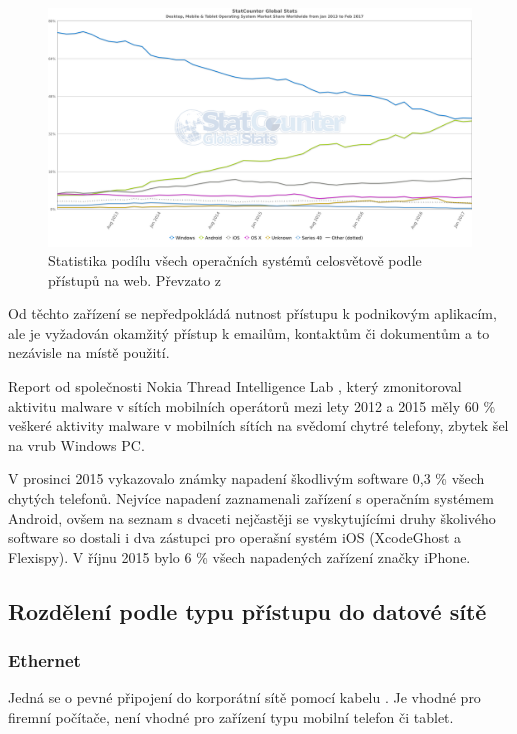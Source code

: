 \begin{figure}[h]
\includegraphics[width=13cm]{img/StatCounter_All_Worldwide}
\caption{Statistika podílu všech operačních systémů celosvětově podle přístupů na web. Převzato z \cite{Statcounter2}} 
\centering
\end{figure}%
 
Od těchto zařízení se nepředpokládá nutnost přístupu k podnikovým aplikacím, ale je vyžadován okamžitý přístup k emailům, kontaktům či dokumentům a to nezávisle na místě použití.

Report od společnosti Nokia Thread Intelligence Lab %
\cite{Nokia2, Nokia1}, který zmonitoroval aktivitu malware v sítích mobilních operátorů mezi lety 2012 a 2015 měly 60 \% veškeré aktivity malware v mobilních sítích na svědomí chytré telefony, zbytek šel na vrub Windows PC.

V prosinci 2015 vykazovalo známky napadení škodlivým software 0,3 \% všech chytých telefonů. Nejvíce napadení zaznamenali zařízení s operačním systémem Android, ovšem na seznam s dvaceti nejčastěji se vyskytujícími druhy školivého software so dostali i dva zástupci pro operašní systém iOS (XcodeGhost a Flexispy). V říjnu 2015 bylo 6 \% všech napadených zařízení značky iPhone.
 
 
 \subsection{Rozdělení podle typu přístupu do datové sítě}
 \subsubsection{Ethernet}%
 Jedná se o pevné připojení do korporátní sítě pomocí kabelu \cite{pcmagEthernet}. Je vhodné pro firemní počítače, není vhodné pro zařízení typu mobilní telefon či tablet.
 
